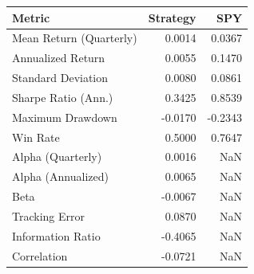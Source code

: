 \begin{tabular}{lrr}
\toprule
Metric & Strategy & SPY \\
\midrule
Mean Return (Quarterly) & 0.0014 & 0.0367 \\
Annualized Return & 0.0055 & 0.1470 \\
Standard Deviation & 0.0080 & 0.0861 \\
Sharpe Ratio (Ann.) & 0.3425 & 0.8539 \\
Maximum Drawdown & -0.0170 & -0.2343 \\
Win Rate & 0.5000 & 0.7647 \\
Alpha (Quarterly) & 0.0016 & NaN \\
Alpha (Annualized) & 0.0065 & NaN \\
Beta & -0.0067 & NaN \\
Tracking Error & 0.0870 & NaN \\
Information Ratio & -0.4065 & NaN \\
Correlation & -0.0721 & NaN \\
\bottomrule
\end{tabular}

